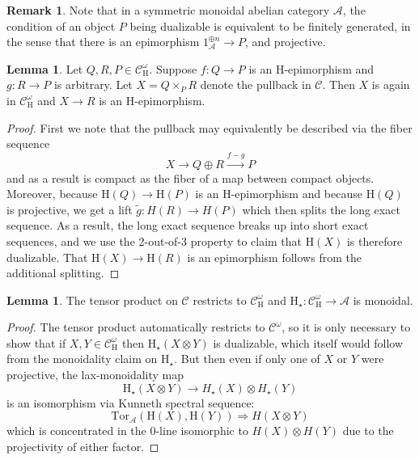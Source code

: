 \documentclass[10pt]{amsart}
\theoremstyle{definition}
\numberwithin{figure}{section}
\numberwithin{equation}{section}
\newtheorem{lemma}[figure]{Lemma}
\newtheorem{remark}[figure]{Remark}
\newcommand{\cA}{\mathcal{A}}
\newcommand{\cC}{\mathcal{C}}
\newcommand{\one}{\mathrm{1}}
\theoremstyle{cited}
\renewcommand{\H}{\mathrm{H}}
\newcommand{\Tor}{\mathrm{Tor}}
\begin{document}
\begin{remark}
  Note that in a symmetric monoidal abelian category $\cA$, the condition of an object $P$ being dualizable is equivalent to be finitely generated, in the sense that there is an epimorphism $\one_{\cA}^{\oplus n}\to P$, and projective.
\end{remark}

\begin{lemma}
  \label{lem:sitepullbacks}
  Let $Q,R,P\in \cC^\omega_\H$. Suppose $f:Q\to P$ is an $\H$-epimorphism and $g:R\to P$ is arbitrary. Let $X=Q\times_P R$ denote the pullback in $\cC$. Then $X$ is again in $\cC^\omega_\H$ and $X\to R$ is an $\H$-epimorphism.
\end{lemma}

\begin{proof}
  First we note that the pullback may equivalently be described via the fiber sequence
  \[
  X\to Q\oplus R \xrightarrow{f-g} P
  \]
  and as a result is compact as the fiber of a map between compact objects. Moreover, because $\H(Q)\to \H(P)$ is an $\H$-epimorphism and because $\H(Q)$ is projective, we get a lift $\tilde g:H(R)\to H(P)$ which then splits the long exact sequence. As a result, the long exact sequence breaks up into short exact sequences, and we use the 2-out-of-3 property to claim that $\H(X)$ is therefore dualizable. That $\H(X)\to \H(R)$ is an epimorphism follows from the additional splitting.
\end{proof}

\begin{lemma}
  \label{lem:sitetensors}
The tensor product on $\cC$ restricts to $\cC^\omega_{\H}$ and $\H_\star:\cC^\omega_\H\to \cA$ is monoidal.
\end{lemma}

\begin{proof}
  The tensor product automatically restricts to $\cC^\omega$, so it is only necessary to show that if $X,Y\in \cC^\omega_\H$ then $\H_\star(X\otimes Y)$ is dualizable, which itself would follow from the monoidality claim on $\H_\star$. But then even if only one of $X$ or $Y$ were projective, the lax-monoidality map
  \[
  \H_\star(X\otimes Y)\to H_\star(X)\otimes H_\star(Y)
  \]
  is an isomorphism via Kunneth spectral sequence:
  \[
  \Tor_{\cA}(\H(X),\H(Y))\Rightarrow H(X\otimes Y)
  \]
  which is concentrated in the $0$-line isomorphic to $H(X)\otimes H(Y)$ due to the projectivity of either factor.
\end{proof}

\end{document}
